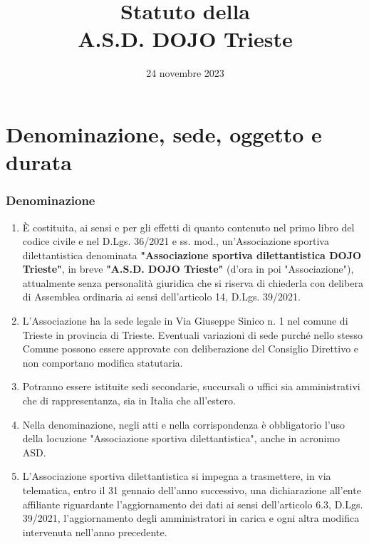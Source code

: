 \documentclass{djtsasddoc}
\title{{\normalfont Statuto della}\\[5pt] A.S.D. DOJO Trieste}
\date{24 novembre 2023}
\begin{document}
	\maketitle
	
	\part{Denominazione, sede, oggetto e durata}
	\section{Denominazione}
	\begin{enumerate}
		\item È costituita, ai sensi e per gli effetti di quanto contenuto nel primo libro del codice civile e nel D.Lgs. 36/2021 e ss. mod., un'Associazione sportiva dilettantistica denominata \textbf{"Associazione sportiva dilettantistica DOJO Trieste"}, in breve \textbf{"A.S.D. DOJO Trieste"} (d'ora in poi "Associazione"), attualmente senza personalità giuridica che si riserva di chiederla con delibera di Assemblea ordinaria ai sensi dell'articolo 14, D.Lgs. 39/2021.
		\item L'Associazione ha la sede legale in Via Giuseppe Sinico n. 1 nel comune di Trieste in provincia di Trieste. Eventuali variazioni di sede purché nello stesso Comune possono essere approvate con deliberazione del Consiglio Direttivo e non comportano modifica statutaria.
		\item Potranno essere istituite sedi secondarie, succursali o uffici sia amministrativi che di rappresentanza, sia in Italia che all'estero.
		\item Nella denominazione, negli atti e nella corrispondenza è obbligatorio l'uso della locuzione "Associazione sportiva dilettantistica", anche in acronimo ASD.
		\item L'Associazione sportiva dilettantistica si impegna a trasmettere, in via telematica, entro il 31 gennaio dell'anno successivo, una dichiarazione all'ente affiliante riguardante l'aggiornamento dei dati ai sensi dell'articolo 6.3, D.Lgs. 39/2021, l'aggiornamento degli amministratori in carica e ogni altra modifica intervenuta nell'anno precedente.
	\end{enumerate}
	
\end{document}
